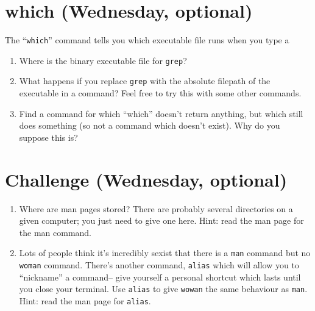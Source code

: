 \documentclass{article}
\begin{document}
\section{which (Wednesday, optional)}
The ``\texttt{which}'' command tells you which executable file runs when you type a 
\begin{enumerate}[a]
\item Where is the binary executable file for \texttt{grep}?
\item What happens if you replace \texttt{grep} with the absolute filepath of the executable in a command?  Feel free to try this with some other commands.
\item Find a command for which ``which'' doesn't return anything, but which still does something (so not a command which doesn't exist).  Why do you suppose this is?
\end{enumerate}



\section{Challenge (Wednesday, optional)}
\begin{enumerate}[a]
\item Where are man pages stored?  There are probably several directories on a given computer; you just need to give one here.  Hint:  read the man page for the man command.

\item Lots of people think it's incredibly sexist that there is a \texttt{man} command but no \texttt{woman} command.  There's another command, \texttt{alias} which will allow you to ``nickname'' a command-- give yourself a personal shortcut which lasts until you close your terminal.  Use \texttt{alias} to give \texttt{wowan} the same behaviour as \texttt{man}.  Hint:  read the man page for \texttt{alias}.

\end{enumerate}

\end{document}
